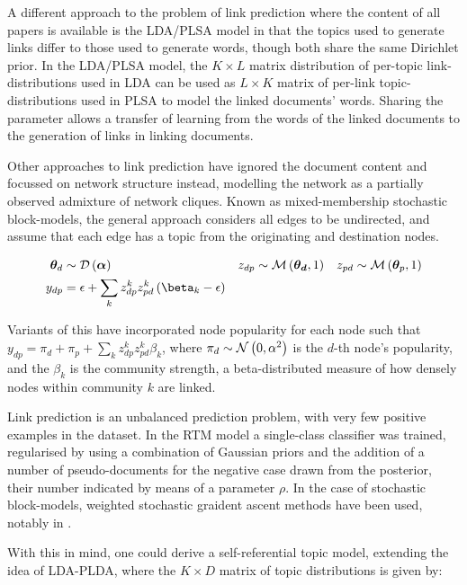 A different approach to the problem of link prediction where the content of all papers is available is the LDA/PLSA model\cite{Nallapati2008}\cite{Nallapati2008a} in that the topics used to generate links differ to those used to generate words, though both share the same Dirichlet prior. In the LDA/PLSA model, the $K \times L$ matrix distribution of per-topic link-distributions used in LDA can be used as $L \times K$ matrix of per-link topic-distributions used in PLSA to model the linked documents' words. Sharing the parameter allows a transfer of learning from the words of the linked documents to the generation of links in linking documents.

Other approaches to link prediction have ignored the document content and focussed on network structure instead, modelling the network as a partially observed admixture of network cliques. Known as mixed-membership stochastic block-models, the general approach\cite{Blei2009} considers all edges to be undirected, and assume that each edge has a topic from the originating and destination nodes.

\begin{align*}
\thd & \sim \dir{\vv{\alpha}} &
z_{dp} & \sim \muln{\vv{\thd}}{1} &
z_{pd} & \sim \muln{\vv{\theta}_p}{1} \\
y_{dp} & = \epsilon + \sum_k z^k_{dp} z^k_{pd} \left( \beta_k - \epsilon\right) 
\end{align*}

Variants of this have incorporated node popularity for each node\cite{Gopalan2013a} such that $y_{dp} = \pi_d + \pi_p + \sum_k z^k_{dp} z^k_{pd} \beta_k$, where $\pi_d \sim \mathcal{N} \left( {0}, {\alpha^2} \right)$ is the $d$-th node's popularity, and the $\beta_k$ is the community strength, a beta-distributed measure of how densely nodes within community $k$ are linked.

Link prediction is an unbalanced prediction problem, with very few positive examples in the dataset. In the RTM model\cite{Chang2009a}\cite{Chang2010a} a single-class classifier was trained, regularised by using a combination of Gaussian priors and the addition of a number of pseudo-documents for the negative case drawn from the posterior, their number indicated by means of a parameter $\rho$. In the case of stochastic block-models, weighted stochastic graident ascent methods have been used, notably in \cite{Gopalan2013a}\cite{Gopalan2013b}.

With this in mind, one could derive a self-referential topic model, extending the idea of LDA-PLDA, where the $K \times D$ matrix of topic distributions is given by: 

